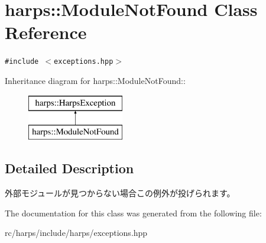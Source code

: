 \section{harps::ModuleNotFound Class Reference}
\label{classharps_1_1ModuleNotFound}
{\tt \#include $<$exceptions.hpp$>$}

Inheritance diagram for harps::ModuleNotFound::\begin{figure}[H]
\begin{center}
\leavevmode
\includegraphics[height=2cm]{classharps_1_1ModuleNotFound}
\end{center}
\end{figure}


\subsection{Detailed Description}
外部モジュールが見つからない場合この例外が投げられます。 

The documentation for this class was generated from the following file:\begin{CompactItemize}
\item 
rc/harps/include/harps/exceptions.hpp\end{CompactItemize}
